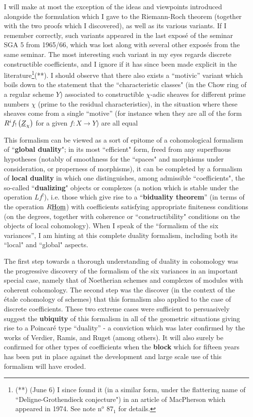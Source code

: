 I will make at most the exception of the ideas and viewpoints introduced alongside the
formulation which I gave to the Riemann-Roch theorem (together with the two proofs which I
discovered), as well as its various variants. If I remember correctly, such variants
appeared in the last expos\'e of the seminar SGA 5 from 1965/66, which was lost along with
several other expos\'es from the same seminar. 
The most interesting such variant in my eyes regards discrete constructible coefficients, 
and I ignore if it has since been made explicit in the literature\footnote{(**) (June 6) I since found it (in a similar form, under the flattering name of ``Deligne-Grothendieck conjecture") in an article of MacPherson which appeared in 1974. See note n$^o$ $87_1$ for details.}(**).
I should observe that there also exists a ``motivic''
variant which boils down to the statement that the ``characteristic classes"
(in the Chow ring of a regular scheme $Y$) 
associated to constructible $\chi$-adic sheaves for different prime numbers $\chi$
(prime to the residual characteristics), in the situation where these sheaves come from a
single ``motive'' (for instance when they are all of the form
$R^if_!\left(\underline{Z}_\chi\right)$ for a given $f \colon X\to Y$) are all equal

\label{note:46.2}

This formalism can be viewed as a sort of epitome of a cohomological formalism of
``\textbf{global duality}"; in its most ``efficient" form, freed from any superfluous hypotheses (notably of
smoothness for the ``spaces" and morphisms under consideration, or properness of morphisms),
it can be completed by a formalism of \textbf{local duality} in which one distinguishes,
among admissible ``coefficients", the
so-called ``\textbf{dualizing}" objects or complexes (a notion which is stable under the operation
$Lf^!$), i.e. those which give rise to a ``\textbf{biduality theorem}''
(in terms of the operation $R\underline{\operatorname{Hom}}$) 
with coefficients satisfying appropriate finiteness conditions (on the degrees, together
with coherence or ``constructibility" conditions on the objects of local cohomology).
When I speak of the ``formalism of the six variances'', I am 
hinting at this complete duality formalism, including both its ``local" and ``global" aspects. 

The first step towards a thorough understanding of duality in cohomology was
the progressive discovery of the formalism of the six variances in an important
special case, namely that of Noetherian schemes and complexes of modules with coherent
cohomology. 
The second step was the discover (in the context of the \'etale cohomology of schemes)
that this formalism also applied to the case of discrete coefficients. 
These two extreme cases were sufficient to 
persuasively suggest the \textbf{ubiquity} of this formalism in all of the geometric situations
giving rise to a Poincar\'e type ``duality'' - a conviction which was later confirmed by
the works of Verdier, Ramis, and Ruget (among others).
It will also surely be confirmed for other types of coefficients when the \textbf{block}
which for fifteen years has been put in place against the development and large scale
use of this formalism will have eroded. 

